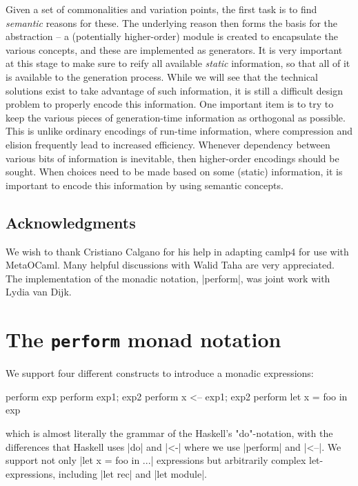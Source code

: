 \documentclass{elsart}
\begin{document}
Given a set of commonalities and variation points, the first task is to
find \emph{semantic} reasons for these.  The underlying reason then
forms the basis for the abstraction -- a (potentially higher-order)
module is created to encapsulate the various concepts, and these are
implemented as generators.  It is very important at this stage to
make sure to reify all available \emph{static} information, so that all
of it is available to the generation process.  While we will see that
the technical solutions exist to take advantage of such information,
it is still a difficult design problem to properly encode this information.
One important item is to try to keep the various pieces of generation-time
information as orthogonal as possible.  This is unlike ordinary encodings
of run-time information, where compression and elision frequently lead
to increased efficiency.  Whenever dependency between various bits of
information is
inevitable, then higher-order encodings should be sought.  When choices
need to be made based on some (static) information, it is important to
encode this information by using semantic concepts.

\subsection*{Acknowledgments}
We wish to thank Cristiano Calgano for his help in adapting camlp4 for
use with MetaOCaml. Many helpful discussions with Walid Taha are very
appreciated. The implementation of the monadic notation, |perform|,
was joint work with Lydia van Dijk.





\appendix
\section{The \texttt{perform} monad notation}
\label{app:perform}
We support four different constructs to introduce a monadic
expressions:
\begin{code}
  perform exp
  perform exp1; exp2
  perform x <-- exp1; exp2
  perform let x = foo in exp
\end{code}
which is almost literally the grammar of the Haskell's "do"-notation,
with the differences that Haskell uses |do| and |<-| where we use
|perform| and |<--|.
We support not only |let x = foo in ...|  expressions but arbitrarily
complex let-expressions, including |let rec| and |let module|.
\end{document}
